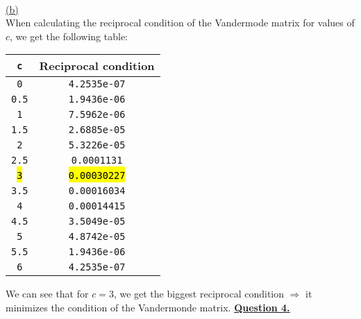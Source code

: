 \documentclass[12pt]{article}
\begin{document}
~\\\hyperlink{toc}{\hypertarget{3.2}{(b)}}\\
When calculating the reciprocal condition of the Vandermode matrix for values of $c$,
we get the following table:
\begin{center}
    \begin{tabular}{|c|c|}
        \hline
        \texttt{c}   & Reciprocal condition \\
        \hline
        \hline
        \texttt{0}   & \texttt{4.2535e-07}  \\
        \texttt{0.5} & \texttt{1.9436e-06}  \\
        \texttt{1}   & \texttt{7.5962e-06}  \\
        \texttt{1.5} & \texttt{2.6885e-05}  \\
        \texttt{2}   & \texttt{5.3226e-05}  \\
        \texttt{2.5} & \texttt{0.0001131}   \\
        \hl{\texttt{3}}   & \hl{\texttt{0.00030227}}  \\
        \texttt{3.5} & \texttt{0.00016034}  \\
        \texttt{4}   & \texttt{0.00014415}  \\
        \texttt{4.5} & \texttt{3.5049e-05}  \\
        \texttt{5}   & \texttt{4.8742e-05}  \\
        \texttt{5.5} & \texttt{1.9436e-06}  \\
        \texttt{6}   & \texttt{4.2535e-07}  \\
        \hline
    \end{tabular}
\end{center}
We can see that for $c=3$, we get the biggest reciprocal condition $\Longrightarrow$ it minimizes the condition of the Vandermonde matrix.
\newpage
\hyperlink{toc}{\hypertarget{4}{\LARGE \underline{\textbf{Question 4.}}}}\\
\end{document}
